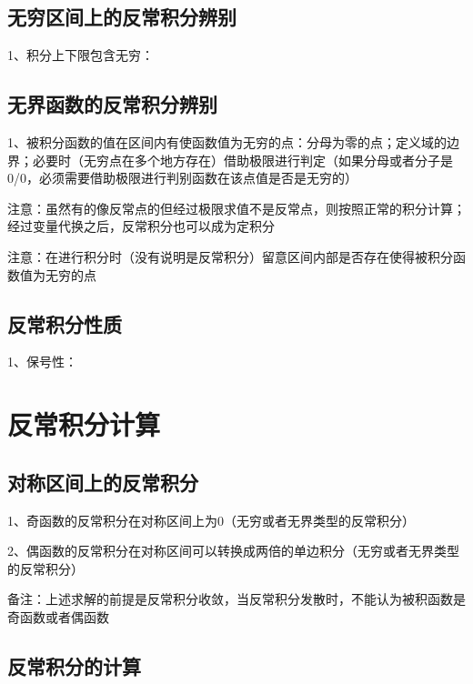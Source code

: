 \subsection{无穷区间上的反常积分辨别}

1、积分上下限包含无穷：



\subsection{无界函数的反常积分辨别}

1、被积分函数的值在区间内有使函数值为无穷的点：分母为零的点；定义域的边界；必要时（无穷点在多个地方存在）借助极限进行判定（如果分母或者分子是0/0，必须需要借助极限进行判别函数在该点值是否是无穷的）

注意：虽然有的像反常点的但经过极限求值不是反常点，则按照正常的积分计算；经过变量代换之后，反常积分也可以成为定积分

注意：在进行积分时（没有说明是反常积分）留意区间内部是否存在使得被积分函数值为无穷的点



\subsection{反常积分性质}

1、保号性：

\section{反常积分计算}



\subsection{对称区间上的反常积分}

1、奇函数的反常积分在对称区间上为0（无穷或者无界类型的反常积分）

2、偶函数的反常积分在对称区间可以转换成两倍的单边积分（无穷或者无界类型的反常积分）

备注：上述求解的前提是反常积分收敛，当反常积分发散时，不能认为被积函数是奇函数或者偶函数



\subsection{反常积分的计算}

